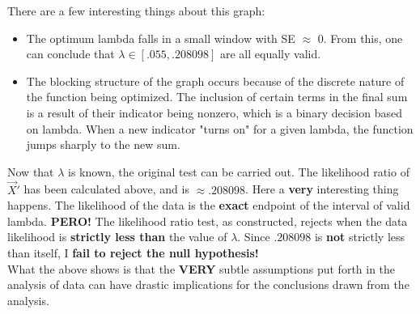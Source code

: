 \documentclass{article}
\begin{document}
      There are a few interesting things about this graph:
      \begin{itemize}
        \item The optimum lambda falls in a small window with SE $\approx$ 0. From this, one can conclude that $\lambda \in [.055, .208098]$ are all equally valid.
        \item The blocking structure of the graph occurs because of the discrete nature of the function being optimized. The inclusion of certain terms in the final sum is a result of their indicator being nonzero, which is a binary decision based on lambda. When a new indicator "turns on" for a given lambda, the function jumps sharply to the new sum.
      \end{itemize}
      Now that $\lambda$ is known, the original test can be carried out. The likelihood ratio of $\vec X'$ has been calculated above, and is $\approx .208098$. Here a \textbf{very} interesting thing happens. The likelihood of the data is the \textbf{exact} endpoint of the interval of valid lambda. \textbf{PERO!} The likelihood ratio test, as constructed, rejects when the data likelihood is \textbf{strictly less than} the value of $\lambda$. Since $.208098$ is \textbf{not} strictly less than itself, I \textbf{fail to reject the null hypothesis!}\\[12pt]
      What the above shows is that the \textbf{VERY} subtle assumptions put forth in the analysis of data can have drastic implications for the conclusions drawn from the analysis.
\end{document}
